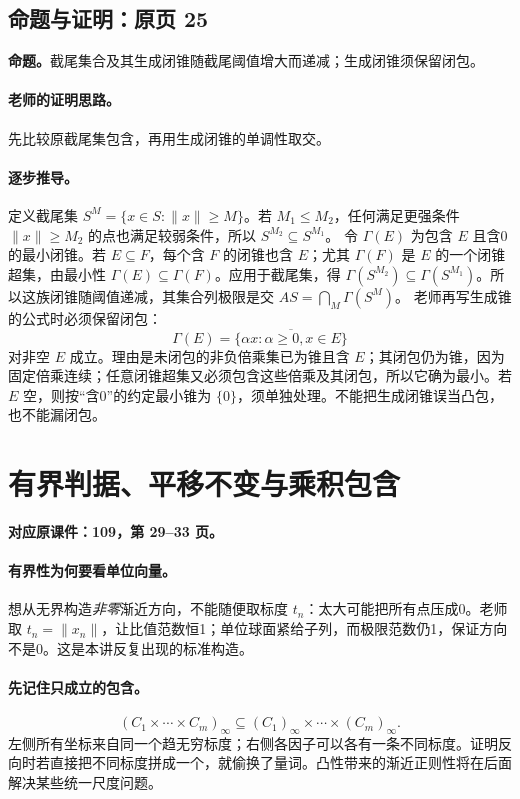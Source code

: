 \documentclass[11pt,a4paper]{article}
\theoremstyle{definition}\newtheorem{definition}{定义}\newtheorem{example}{例}
\begin{document}
\subsection{命题与证明：原页 25}

\textbf{命题。}截尾集合及其生成闭锥随截尾阈值增大而递减；生成闭锥须保留闭包。

\paragraph{老师的证明思路。}先比较原截尾集包含，再用生成闭锥的单调性取交。

\paragraph{逐步推导。}
定义截尾集 $S^M=\{x\in S:\|x\|\ge M\}$。若 $M_1\le M_2$，任何满足更强条件 $\|x\|\ge M_2$ 的点也满足较弱条件，所以 $S^{M_2}\subseteq S^{M_1}$。
令 $\Gamma(E)$ 为包含 $E$ 且含0的最小闭锥。若 $E\subseteq F$，每个含 $F$ 的闭锥也含 $E$；尤其 $\Gamma(F)$ 是 $E$ 的一个闭锥超集，由最小性 $\Gamma(E)\subseteq\Gamma(F)$。应用于截尾集，得 $\Gamma(S^{M_2})\subseteq\Gamma(S^{M_1})$。所以这族闭锥随阈值递减，其集合列极限是交 $A S=\bigcap_M\Gamma(S^M)$。
老师再写生成锥的公式时必须保留闭包：
\[\Gamma(E)=\overline{\{\alpha x:\alpha\ge0,x\in E\}}\]
对非空 $E$ 成立。理由是未闭包的非负倍乘集已为锥且含 $E$；其闭包仍为锥，因为固定倍乘连续；任意闭锥超集又必须包含这些倍乘及其闭包，所以它确为最小。若 $E$ 空，则按“含0”的约定最小锥为 $\{0\}$，须单独处理。不能把生成闭锥误当凸包，也不能漏闭包。


\clearpage\section{有界判据、平移不变与乘积包含}\label{g:109:29}

\textbf{对应原课件：109，第 29--33 页。}


\paragraph{有界性为何要看单位向量。}
想从无界构造\emph{非零}渐近方向，不能随便取标度 $t_n$：太大可能把所有点压成0。老师取 $t_n=\|x_n\|$，让比值范数恒1；单位球面紧给子列，而极限范数仍1，保证方向不是0。这是本讲反复出现的标准构造。
\paragraph{先记住只成立的包含。}
\[(C_1\times\cdots\times C_m)_\infty
\subseteq(C_1)_\infty\times\cdots\times(C_m)_\infty.
\]
左侧所有坐标来自同一个趋无穷标度；右侧各因子可以各有一条不同标度。证明反向时若直接把不同标度拼成一个，就偷换了量词。凸性带来的渐近正则性将在后面解决某些统一尺度问题。
\end{document}
